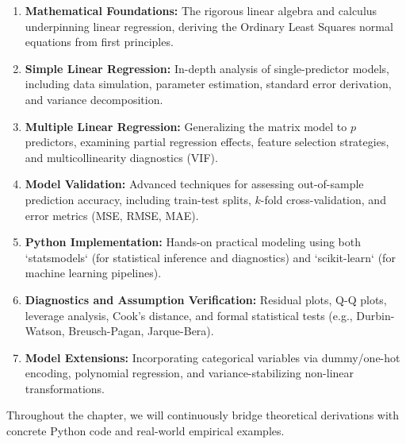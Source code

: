 \begin{enumerate}
	\item \textbf{Mathematical Foundations:} The rigorous linear algebra and calculus underpinning linear regression, deriving the Ordinary Least Squares normal equations from first principles.
	\item \textbf{Simple Linear Regression:} In-depth analysis of single-predictor models, including data simulation, parameter estimation, standard error derivation, and variance decomposition.
	\item \textbf{Multiple Linear Regression:} Generalizing the matrix model to $p$ predictors, examining partial regression effects, feature selection strategies, and multicollinearity diagnostics (VIF).
	\item \textbf{Model Validation:} Advanced techniques for assessing out-of-sample prediction accuracy, including train-test splits, $k$-fold cross-validation, and error metrics (MSE, RMSE, MAE).
	\item \textbf{Python Implementation:} Hands-on practical modeling using both `statsmodels` (for statistical inference and diagnostics) and `scikit-learn` (for machine learning pipelines).
	\item \textbf{Diagnostics and Assumption Verification:} Residual plots, Q-Q plots, leverage analysis, Cook's distance, and formal statistical tests (e.g., Durbin-Watson, Breusch-Pagan, Jarque-Bera).
	\item \textbf{Model Extensions:} Incorporating categorical variables via dummy/one-hot encoding, polynomial regression, and variance-stabilizing non-linear transformations.
\end{enumerate}

Throughout the chapter, we will continuously bridge theoretical derivations with concrete Python code and real-world empirical examples.
